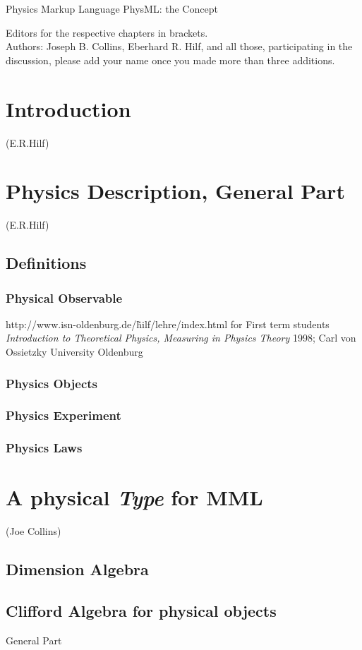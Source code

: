 \documentclass[12pt]{article}
\begin{document}
\centerline{\Large Physics Markup Language PhysML: the Concept} 
Editors for the respective chapters in brackets.
\\

Authors: Joseph B. Collins, Eberhard R. Hilf, and all those, participating in the discussion, please add your name once you made more than three additions.
\tableofcontents
\newpage 
\section{Introduction}
(E.R.Hilf)

\section{Physics Description, General Part}
(E.R.Hilf)
\subsection{Definitions}
\subsubsection{Physical Observable}
http://www.isn-oldenburg.de/\~hilf/lehre/index.html
for First term students
\textit{Introduction to Theoretical Physics, Measuring in Physics Theory
} 1998; Carl von Ossietzky University Oldenburg
\\


\subsubsection{Physics Objects}
\subsubsection{Physics Experiment}
\subsubsection{Physics Laws}
\section{A physical \textit{Type} for MML}
(Joe Collins) 
\subsection{Dimension Algebra}
\subsection{Clifford Algebra for physical objects}
General Part
\end{document}

